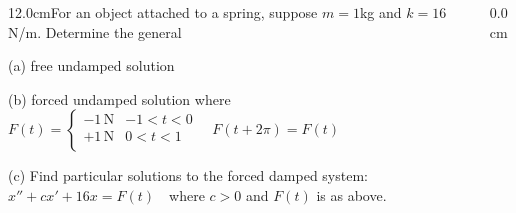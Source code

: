 \begin{frame}
\scriptsize
\begin{columns}\begin{column}{12.0cm}\EX For an object attached to a spring, suppose $m=1$kg and $k=16$N/m.  Determine the general 

\vspace{0.2cm}

(a) free undamped solution

(b) forced undamped solution where 
$F(t) = \left\{
\begin{array}{lr}
	-1 \,\text{N}& -1 < t < 0\\
	+1 \,\text{N}&  0 < t < 1\\
\end{array}
\right. \quad F(t+2\pi)=F(t)$ 

\vspace{0.1cm}

(c) Find particular solutions to the forced damped system: $x'' + cx' + 16x = F(t)$ \,\, where $c>0$ and $F(t)$ is as above.

\vspace{0.2cm}

\SOL 

\vspace{0.6cm}

\vspace{5.8cm}

\end{column}\begin{column}{0.0cm}\end{column}\end{columns}
\end{frame}

